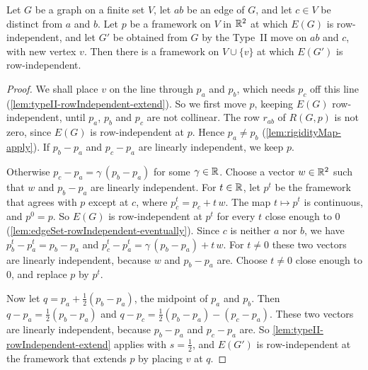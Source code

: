 \begin{lemma}
  \label{lem:typeII-rowIndependent-lift}
  \leanok
  Let $G$ be a graph on a finite set $V$, let $ab$ be an edge of $G$,
  and let $c \in V$ be distinct from $a$ and $b$. Let $p$ be a
  framework on $V$ in ${\mathbb{R}}^{2}$ at which $E(G)$ is row-independent, and
  let $G'$ be obtained from $G$ by the Type~II move on $ab$ and $c$,
  with new vertex $v$. Then there is a framework on $V \cup \{v\}$ at
  which $E(G')$ is row-independent.
\end{lemma}
\begin{proof}
  \leanok
  We shall place $v$ on the line through $p_a$ and $p_b$, which needs
  $p_c$ off this line (\cref{lem:typeII-rowIndependent-extend}). So we
  first move $p$, keeping $E(G)$ row-independent, until $p_a$, $p_b$
  and $p_c$ are not collinear. The row $r_{ab}$ of $R(G, p)$ is not
  zero, since $E(G)$ is row-independent at $p$. Hence $p_a \ne p_b$
  (\cref{lem:rigidityMap-apply}). If $p_b - p_a$ and $p_c - p_a$ are
  linearly independent, we keep $p$.

  Otherwise $p_c - p_a = \gamma\,(p_b - p_a)$ for some $\gamma \in {\mathbb{R}}$.
  Choose a vector $w \in {\mathbb{R}}^{2}$ such that $w$ and $p_b - p_a$ are
  linearly independent. For $t \in {\mathbb{R}}$, let $p^{t}$ be the framework
  that agrees with $p$ except at $c$, where $p^{t}_c = p_c + t\,w$. The
  map $t \mapsto p^{t}$ is continuous, and $p^{0} = p$. So $E(G)$ is
  row-independent at $p^{t}$ for every $t$ close enough to $0$
  (\cref{lem:edgeSet-rowIndependent-eventually}). Since $c$ is neither
  $a$ nor $b$, we have $p^{t}_b - p^{t}_a = p_b - p_a$ and
  $p^{t}_c - p^{t}_a = \gamma\,(p_b - p_a) + t\,w$. For $t \ne 0$ these
  two vectors are linearly independent, because $w$ and $p_b - p_a$
  are. Choose $t \ne 0$ close enough to $0$, and replace $p$ by
  $p^{t}$.

  Now let $q = p_a + \tfrac{1}{2}(p_b - p_a)$, the midpoint of $p_a$
  and $p_b$. Then $q - p_a = \tfrac{1}{2}(p_b - p_a)$ and
  $q - p_c = \tfrac{1}{2}(p_b - p_a) - (p_c - p_a)$. These two vectors
  are linearly independent, because $p_b - p_a$ and $p_c - p_a$ are.
  So \cref{lem:typeII-rowIndependent-extend} applies with
  $s = \tfrac{1}{2}$, and $E(G')$ is row-independent at the framework
  that extends $p$ by placing $v$ at $q$.
\end{proof}

